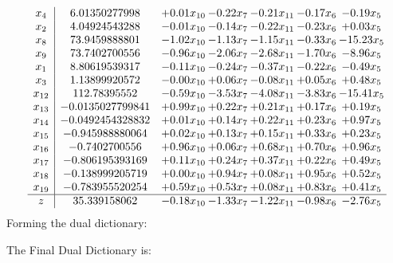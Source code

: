 \documentclass[8pt]{article}
\begin{document}
\[\begin{array}{c| c c@{\hskip 2pt} c@{\hskip 2pt} c@{\hskip 2pt} c@{\hskip 2pt} c@{\hskip 2pt} }
 x_{4}   &  6.01350277998 & +  0.01 x_{10} & -0.22 x_{7} & -0.21 x_{11} & -0.17 x_{6} & -0.19 x_{5}\\
 x_{2}   &  4.04924543288 & -0.01 x_{10} & -0.14 x_{7} & -0.22 x_{11} & -0.23 x_{6} & +  0.03 x_{5}\\
 x_{8}   &  73.9459888801 & -1.02 x_{10} & -1.13 x_{7} & -1.15 x_{11} & -0.33 x_{6} & -15.23 x_{5}\\
 x_{9}   &  73.7402700556 & -0.96 x_{10} & -2.06 x_{7} & -2.68 x_{11} & -1.70 x_{6} & -8.96 x_{5}\\
 x_{1}   &  8.80619539317 & -0.11 x_{10} & -0.24 x_{7} & -0.37 x_{11} & -0.22 x_{6} & -0.49 x_{5}\\
 x_{3}   &  1.13899920572 & -0.00 x_{10} & +  0.06 x_{7} & -0.08 x_{11} & +  0.05 x_{6} & +  0.48 x_{5}\\
 x_{12}   &  112.78395552 & -0.59 x_{10} & -3.53 x_{7} & -4.08 x_{11} & -3.83 x_{6} & -15.41 x_{5}\\
 x_{13}   &  -0.0135027799841 & +  0.99 x_{10} & +  0.22 x_{7} & +  0.21 x_{11} & +  0.17 x_{6} & +  0.19 x_{5}\\
 x_{14}   &  -0.0492454328832 & +  0.01 x_{10} & +  0.14 x_{7} & +  0.22 x_{11} & +  0.23 x_{6} & +  0.97 x_{5}\\
 x_{15}   &  -0.945988880064 & +  0.02 x_{10} & +  0.13 x_{7} & +  0.15 x_{11} & +  0.33 x_{6} & +  0.23 x_{5}\\
 x_{16}   &  -0.7402700556 & +  0.96 x_{10} & +  0.06 x_{7} & +  0.68 x_{11} & +  0.70 x_{6} & +  0.96 x_{5}\\
 x_{17}   &  -0.806195393169 & +  0.11 x_{10} & +  0.24 x_{7} & +  0.37 x_{11} & +  0.22 x_{6} & +  0.49 x_{5}\\
 x_{18}   &  -0.138999205719 & +  0.00 x_{10} & +  0.94 x_{7} & +  0.08 x_{11} & +  0.95 x_{6} & +  0.52 x_{5}\\
 x_{19}   &  -0.783955520254 & +  0.59 x_{10} & +  0.53 x_{7} & +  0.08 x_{11} & +  0.83 x_{6} & +  0.41 x_{5}\\
\hline
z    &  35.339158062 & -0.18 x_{10} & -1.33 x_{7} & -1.22 x_{11} & -0.98 x_{6} & -2.76 x_{5}\\
\end{array}\]
Forming the dual dictionary:

The Final Dual Dictionary is: 
\end{document}
